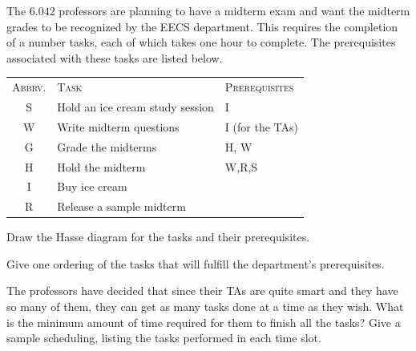 \documentclass[12pt,oneside]{article}
\begin{document}
\newpage
\begin{problem}{20}
The $6.042$ professors are planning to have a midterm exam and want the midterm grades to be recognized by the EECS department. This requires the completion of a number
tasks, each of which takes one hour to complete.  The prerequisites associated with these tasks are
listed below.
\begin{center}
\begin{tabular}{cll}
\textsc{Abbrv.} & \textsc{Task} & \textsc{Prerequisites} \\
S & Hold an ice cream study session & I\\
W & Write midterm questions &  I (for the TAs)\\
G & Grade the midterms & H, W\\
H & Hold the midterm & W,R,S \\
I & Buy ice cream &  \\
R & Release a sample midterm & 
\end{tabular}
\end{center}

\bparts

 Draw the Hasse diagram for the tasks and their
prerequisites.
  

 Give one ordering of the tasks that will fulfill the department's prerequisites.

 The professors have decided that since their TAs are quite
smart and they have so many of them, they can get as many tasks done at a time as
they wish.  What is the minimum amount of time required for them to
finish all the tasks? Give a sample scheduling, listing the tasks performed in each time slot.


\end{problem}
\end{document}
